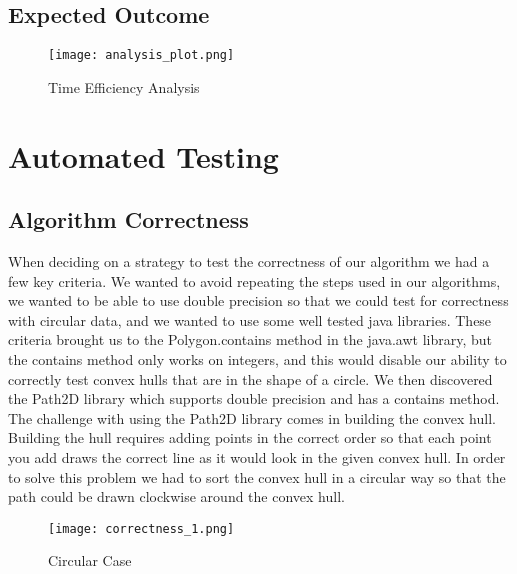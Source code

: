 \documentclass[a4paper, 12pt]{article}
\begin{document}
{  \subsection{Expected Outcome}
  \begin{figure}[H]
    \texttt{[image: analysis\_plot.png]}
    \caption{Time Efficiency Analysis}
    \label{fig:time_plot}
  \end{figure} 
  \section{Automated Testing}
  \subsection{Algorithm Correctness}
  When deciding on a strategy to test the correctness of our algorithm we had a few key criteria. We wanted to avoid repeating the steps used in our algorithms, we wanted to be able to use double precision so that we could test for correctness with circular data, and we wanted to use some well tested java libraries. These criteria brought us to the Polygon.contains method in the java.awt library, but the contains method only works on integers, and this would disable our ability to correctly test convex hulls that are in the shape of a circle. We then discovered the Path2D library which supports double precision and has a contains method. The challenge with using the Path2D library comes in building the convex hull. Building the hull requires adding points in the correct order so that each point you add draws the correct line as it would look in the given convex hull. In order to solve this problem we had to sort the convex hull in a circular way so that the path could be drawn clockwise around the convex hull.
  \begin{figure}[H]
    \texttt{[image: correctness\_1.png]}
    \caption{Circular Case}
    \label{fig:correctness_1}
  \end{figure} 
}
\end{document}
